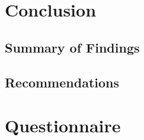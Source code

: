 \documentclass[12pt]{report}
\begin{document}
\chapter{Conclusion}
\begin{multicols}{2}

\section{Summary of Findings}
\kant[1]

\section{Recommendations}
\kant[2]

\end{multicols}

\printbibliography[heading=bibintoc, title={References}]

\appendix
\chapter{Questionnaire}
\kant[3]

\end{document}
